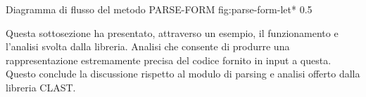       {Diagramma di flusso del metodo PARSE-FORM}
      {fig:parse-form-let*}
      {0.5}

Questa sottosezione ha presentato, attraverso un esempio, il funzionamento e
l’analisi svolta dalla libreria. Analisi che consente di produrre una
rappresentazione estremamente precisa del codice fornito in input a questa.
Questo conclude la discussione rispetto al modulo di parsing e analisi offerto
dalla libreria CLAST.
